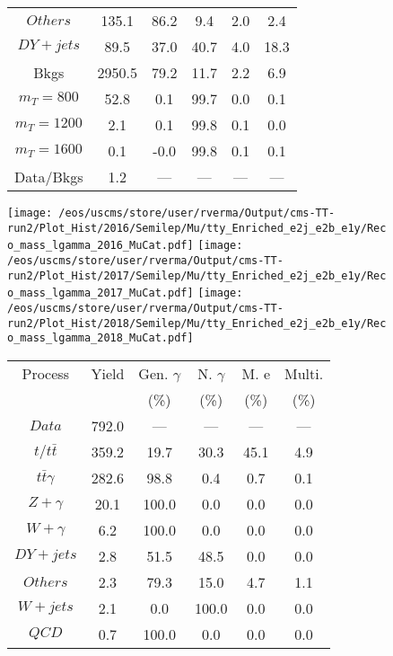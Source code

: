 \begin{figure}
\begin{minipage}[c]{0.32\textwidth}
{\begin{tabular}{cccccc}
$ Others $ &  135.1 &  86.2 &  9.4 &  2.0 &  2.4\\
$ DY+jets $ &  89.5 &  37.0 &  40.7 &  4.0 &  18.3\\
Bkgs &  2950.5 &  79.2 &  11.7 &  2.2 &  6.9\\
$ m_{T} = 800 $ &  52.8 &  0.1 &  99.7 &  0.0 &  0.1\\
$ m_{T} = 1200 $ &  2.1 &  0.1 &  99.8 &  0.1 &  0.0\\
$ m_{T} = 1600 $ &  0.1 &  -0.0 &  99.8 &  0.1 &  0.1\\
Data/Bkgs &  1.2 &  --- &  --- &  --- &  ---\\
\hline
\end{tabular}
}
\end{minipage}
\end{figure}

\begin{figure}
\centering
\texttt{[image: /eos/uscms/store/user/rverma/Output/cms-TT-run2/Plot\_Hist/2016/Semilep/Mu/tty\_Enriched\_e2j\_e2b\_e1y/Reco\_mass\_lgamma\_2016\_MuCat.pdf]}
\texttt{[image: /eos/uscms/store/user/rverma/Output/cms-TT-run2/Plot\_Hist/2017/Semilep/Mu/tty\_Enriched\_e2j\_e2b\_e1y/Reco\_mass\_lgamma\_2017\_MuCat.pdf]}
\texttt{[image: /eos/uscms/store/user/rverma/Output/cms-TT-run2/Plot\_Hist/2018/Semilep/Mu/tty\_Enriched\_e2j\_e2b\_e1y/Reco\_mass\_lgamma\_2018\_MuCat.pdf]}
\begin{minipage}[c]{0.32\textwidth}
\centering
\tiny{
\begin{tabular}{cccccc}
\hline
Process & Yield & Gen. $\gamma$ & N. $\gamma$ & M. e & Multi. \\
 &  & (\%) & (\%) & (\%) & (\%)  \\
\hline
                                                                      $ Data $ &  792.0 &  --- &  --- &  --- &  ---\\
$ t/t\bar{t} $ &  359.2 &  19.7 &  30.3 &  45.1 &  4.9\\
$ t\bar{t}\gamma $ &  282.6 &  98.8 &  0.4 &  0.7 &  0.1\\
$ Z+\gamma $ &  20.1 &  100.0 &  0.0 &  0.0 &  0.0\\
$ W+\gamma $ &  6.2 &  100.0 &  0.0 &  0.0 &  0.0\\
$ DY+jets $ &  2.8 &  51.5 &  48.5 &  0.0 &  0.0\\
$ Others $ &  2.3 &  79.3 &  15.0 &  4.7 &  1.1\\
$ W+jets $ &  2.1 &  0.0 &  100.0 &  0.0 &  0.0\\
$ QCD $ &  0.7 &  100.0 &  0.0 &  0.0 &  0.0\\

\end{tabular}}
\end{minipage}
\end{figure}
